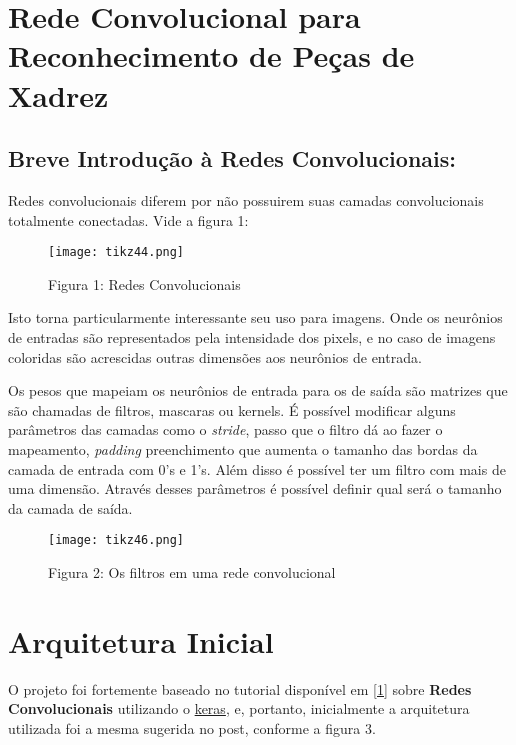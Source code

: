 






\section{Rede Convolucional para Reconhecimento de Peças de
Xadrez}\label{rede-convolucional}

    \subsection{Breve Introdução à Redes
Convolucionais:}\label{breve-introducao-a-redes-convolucionais}

Redes convolucionais diferem por não possuirem suas camadas
convolucionais totalmente conectadas. Vide a figura 1:

\begin{figure}[ht]
\centering
\texttt{[image: tikz44.png]}
\caption{Figura 1: Redes Convolucionais}
\end{figure}

Isto torna particularmente interessante seu uso para imagens. Onde os
neurônios de entradas são representados pela intensidade dos pixels, e
no caso de imagens coloridas são acrescidas outras dimensões aos
neurônios de entrada.

Os pesos que mapeiam os neurônios de entrada para os de saída são
matrizes que são chamadas de filtros, mascaras ou kernels. É possível
modificar alguns parâmetros das camadas como o \emph{stride}, passo que
o filtro dá ao fazer o mapeamento, \emph{padding} preenchimento que
aumenta o tamanho das bordas da camada de entrada com 0's e 1's. Além
disso é possível ter um filtro com mais de uma dimensão. Através desses
parâmetros é possível definir qual será o tamanho da camada de saída.

\begin{figure}[ht]
\centering
\texttt{[image: tikz46.png]}
\caption{Figura 2: Os filtros em uma rede convolucional}
\end{figure}

    \section{Arquitetura Inicial}\label{arquitetura-inicial}

O projeto foi fortemente baseado no tutorial disponível em
\href{http://adventuresinmachinelearning.com/keras-tutorial-cnn-11-lines/}{[1]} sobre \textbf{Redes
Convolucionais} utilizando o \href{https://keras.io/}{keras}, e, portanto, inicialmente a
arquitetura utilizada foi a mesma sugerida no post, conforme a figura 3.

